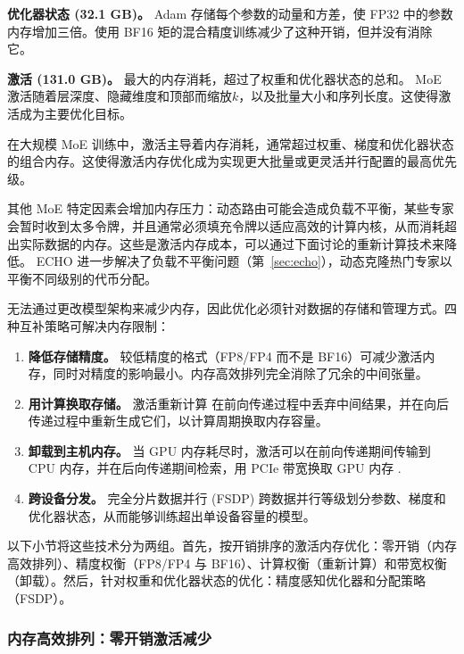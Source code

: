 \textbf{优化器状态 (32.1 GB)。} Adam 存储每个参数的动量和方差，使 FP32 中的参数内存增加三倍。使用 BF16 矩的混合精度训练减少了这种开销，但并没有消除它。

\textbf{激活 (131.0 GB)。} 最大的内存消耗，超过了权重和优化器状态的总和。 MoE 激活随着层深度、隐藏维度和顶部而缩放$k$，以及批量大小和序列长度。这使得激活成为主要优化目标。

\begin{notebox}
在大规模 MoE 训练中，激活主导着内存消耗，通常超过权重、梯度和优化器状态的组合内存。这使得激活内存优化成为实现更大批量或更灵活并行配置的最高优先级。
\end{notebox}

其他 MoE 特定因素会增加内存压力：动态路由可能会造成负载不平衡，某些专家会暂时收到太多令牌，并且通常必须填充令牌以适应高效的计算内核，从而消耗超出实际数据的内存。这些是激活内存成本，可以通过下面讨论的重新计算技术来降低。 ECHO 进一步解决了负载不平衡问题（第~\ref{sec:echo}），动态克隆热门专家以平衡不同级别的代币分配。

无法通过更改模型架构来减少内存，因此优化必须针对数据的存储和管理方式。四种互补策略可解决内存限制：

\begin{enumerate}
    \item \textbf{降低存储精度。} 较低精度的格式（FP8/FP4 而不是 BF16）可减少激活内存，同时对精度的影响最小。内存高效排列完全消除了冗余的中间张量。
    \item \textbf{用计算换取存储。} 激活重新计算 \cite{chen2016training,korthikanti2022reducingactivationrecomputationlarge,beaumont2021optimal} 在前向传递过程中丢弃中间结果，并在向后传递过程中重新生成它们，以计算周期换取内存容量。
    \item \textbf{卸载到主机内存。} 当 GPU 内存耗尽时，激活可以在前向传递期间传输到 CPU 内存，并在后向传递期间检索，用 PCIe 带宽换取 GPU 内存 \cite{ren2021zerooffload}.
    \item \textbf{跨设备分发。} 完全分片数据并行 (FSDP) \cite{zhao2023pytorchfsdp,rajbhandari2020zero,rajbhandari2021zeroinf,rajbhandari2023zeropp} 跨数据并行等级划分参数、梯度和优化器状态，​​从而能够训练超出单设备容量的模型。 
\end{enumerate}

以下小节将这些技术分为两组。首先，按开销排序的激活内存优化：零开销（内存高效排列）、精度权衡（FP8/FP4 与 BF16）、计算权衡（重新计算）和带宽权衡（卸载）。然后，针对权重和优化器状态的优化：精度感知优化器和分配策略（FSDP）。

\subsubsection{内存高效排列：零开销激活减少}\label{sec:mem-eff-permute}

